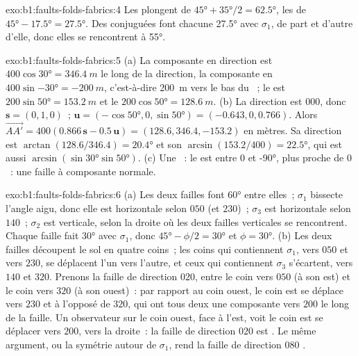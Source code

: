 \begin{solution}{exo:b1:faults-folds-fabrics:4}
Les  plongent de $\ang{45} + \ang{35}/2 = \ang{62.5}$, les  de
$\ang{45} - \ang{17.5} = \ang{27.5}$. Des  conjuguées font chacune
\ang{27.5} avec $\sigma_1$, de part et d'autre d'elle, donc elles se rencontrent à \ang{55}.
\end{solution}

\begin{solution}{exo:b1:faults-folds-fabrics:5}
(a) La composante en direction est $400\cos\ang{30} = \qty{346.4}{m}$ le long de la
direction, la composante en  $400\sin\ang{-30} = \qty{-200}{m}$, c'est-à-dire
\qty{200}{m} vers le bas du ~; le  est $200\sin\ang{50} = \qty{153.2}{m}$ et
le  $200\cos\ang{50} = \qty{128.6}{m}$. (b) La direction est $000$, donc
$\mathbf s = (0, 1, 0)$~; $\mathbf u = (-\cos\ang{50}, 0, \sin\ang{50}) =
(-0.643, 0, 0.766)$. Alors
$\overrightarrow{AA'} = 400(0.866\,\mathbf s - 0.5\,\mathbf u) =
(128.6, 346.4, -153.2)$ en mètres. Sa direction est $\arctan(128.6/346.4) =
\ang{20.4}$ et son  $\arcsin(153.2/400) = \ang{22.5}$, qui est aussi
$\arcsin(\sin\ang{30}\sin\ang{50})$. (c) Une ~: le  est
entre $0$ et \ang{-90}, plus proche de $0$~: une faille  à composante
normale.
\end{solution}

\begin{solution}{exo:b1:faults-folds-fabrics:6}
(a) Les deux failles font \ang{60} entre elles~; $\sigma_1$ bissecte l'angle
aigu, donc elle est horizontale selon $050$ (et $230$)~; $\sigma_3$ est horizontale
selon $140$~; $\sigma_2$ est verticale, selon la droite où les deux failles verticales
se rencontrent. Chaque faille fait \ang{30} avec $\sigma_1$, donc $\ang{45} - \phi/2 =
\ang{30}$ et $\phi = \ang{30}$. (b) Les deux failles découpent le sol en quatre
coins~; les coins qui contiennent $\sigma_1$, vers $050$ et vers $230$, se déplacent
l'un vers l'autre, et ceux qui contiennent $\sigma_3$ s'écartent, vers $140$
et $320$. Prenons la faille de direction $020$, entre le coin vers $050$ (à son
est) et le coin vers $320$ (à son ouest)~: par rapport au coin ouest,
le coin est se déplace vers $230$ et à l'opposé de $320$, qui ont tous deux une
composante vers $200$ le long de la faille. Un observateur sur le coin ouest,
face à l'est, voit le coin est se déplacer vers $200$, vers la droite~: la faille
de direction $020$ est . Le même argument, ou la symétrie autour de
$\sigma_1$, rend la faille de direction $080$ .
\end{solution}

